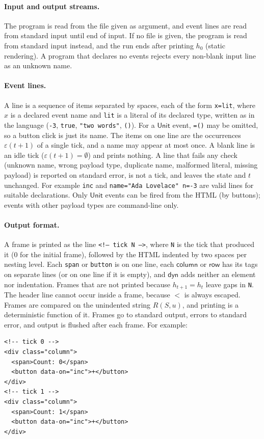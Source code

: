 \documentclass{article}
\newcommand{\kw}[1]{\mathsf{#1}}
\begin{document}
\paragraph{Input and output streams.} The program is read from the file given as argument, and event lines are read from standard input until end of input. If no file is given, the program is read from standard input instead, and the run ends after printing $h_0$ (static rendering). A program that declares no events rejects every non-blank input line as an unknown name.

\paragraph{Event lines.} A line is a sequence of items separated by spaces, each of the form \texttt{x=lit}, where $x$ is a declared event name and \texttt{lit} is a literal of its declared type, written as in the language (\texttt{-3}, \texttt{true}, \texttt{"two words"}, \texttt{()}). For a $\kw{Unit}$ event, \texttt{=()} may be omitted, so a button click is just its name. The items on one line are the occurrences $\varepsilon(t+1)$ of a single tick, and a name may appear at most once. A blank line is an idle tick ($\varepsilon(t+1) = \emptyset$) and prints nothing. A line that fails any check (unknown name, wrong payload type, duplicate name, malformed literal, missing payload) is reported on standard error, is not a tick, and leaves the state and $t$ unchanged. For example \texttt{inc} and \texttt{name="Ada Lovelace" n=-3} are valid lines for suitable declarations. Only $\kw{Unit}$ events can be fired from the HTML (by buttons); events with other payload types are command-line only.

\paragraph{Output format.} A frame is printed as the line \texttt{\textless!-- tick N --\textgreater}, where \texttt{N} is the tick that produced it (0 for the initial frame), followed by the HTML indented by two spaces per nesting level. Each \texttt{span} or \texttt{button} is on one line, each $\kw{column}$ or $\kw{row}$ has its tags on separate lines (or on one line if it is empty), and $\kw{dyn}$ adds neither an element nor indentation. Frames that are not printed because $h_{t+1} = h_t$ leave gaps in \texttt{N}. The header line cannot occur inside a frame, because $<$ is always escaped. Frames are compared on the unindented string $R(S,u)$, and printing is a deterministic function of it. Frames go to standard output, errors to standard error, and output is flushed after each frame. For example:
\begin{verbatim}
<!-- tick 0 -->
<div class="column">
  <span>Count: 0</span>
  <button data-on="inc">+</button>
</div>
<!-- tick 1 -->
<div class="column">
  <span>Count: 1</span>
  <button data-on="inc">+</button>
</div>
\end{verbatim}
\end{document}
